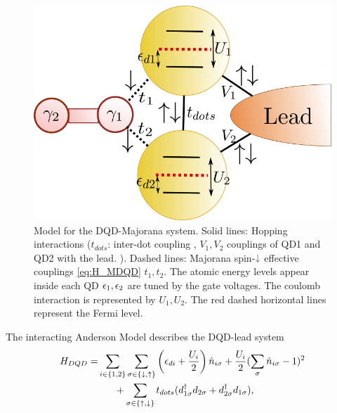 \documentclass[showpacs,aps,prb,reprint,superscriptaddress]{revtex4-1}
\begin{document}
\begin{figure}[bt]
\begin{center}
\includegraphics[scale=0.4]{Graficos/GenModel.png}
\caption{ Model for the DQD-Majorana system. Solid lines: Hopping interactions ($t_{dots}$: inter-dot coupling , $V_1,V_2$ couplings of QD1 and QD2 with the lead. ). Dashed lines: Majorana spin-$\downarrow$ effective couplings \eqref{eq:H_MDQD} $t_1,t_2$. The atomic energy levels appear inside each QD $\epsilon_1, \epsilon_2$ are tuned by the gate voltages. The coulomb interaction is represented by $U_1,U_2$.  The red dashed horizontal lines represent the Fermi level.
}
%
\label{fig:GenModel}
\end{center}
\end{figure}
The interacting Anderson Model describes the DQD-lead system  
\begin{align}
\begin{split}
    H_{DQD}=&  \sum_{i\in\{1,2\}} \sum_{\sigma\in \{ \downarrow , \uparrow\}}  \left(\epsilon_{di}+\frac{U_i}{2}\right)\hat{n}_{i\sigma}+ \frac{U_i}{2}(\sum_{\sigma} \hat{n}_{i\sigma}-1)^{2} \\ 
&\ \ \ \ \ + \sum_{\sigma \in \{\uparrow , \downarrow\}} t_{dots}(d^{\dagger}_{1\sigma}  d_{2\sigma}+d^{\dagger}_{2\sigma}  d_{1\sigma}), \label{eq:H_DQD}
\end{split}
\end{align}
\end{document}
